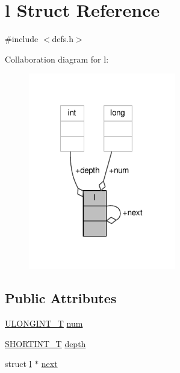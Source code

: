 \hypertarget{structl}{\section{l Struct Reference}
\label{structl}
}


{\ttfamily \#include $<$defs.\-h$>$}



Collaboration diagram for l\-:
\nopagebreak
\begin{figure}[H]
\begin{center}
\leavevmode
\includegraphics[width=182pt]{structl__coll__graph}
\end{center}
\end{figure}
\subsection*{Public Attributes}
\begin{DoxyCompactItemize}
\item 
\hyperlink{defs_8h_ade719b705ff384b386384c9385517e0b}{U\-L\-O\-N\-G\-I\-N\-T\-\_\-\-T} \hyperlink{structl_a24f894f7c4a5b30db843077b31cc1d59}{num}
\item 
\hyperlink{defs_8h_ae68d33393edf382be4a3534552ddd4cc}{S\-H\-O\-R\-T\-I\-N\-T\-\_\-\-T} \hyperlink{structl_ad178d1f0ccdeae3fede5d0cbf6b3ba34}{depth}
\item 
struct \hyperlink{structl}{l} $\ast$ \hyperlink{structl_a304ca9c94026094f5dc7a8ac5f79e65a}{next}
\end{DoxyCompactItemize}


